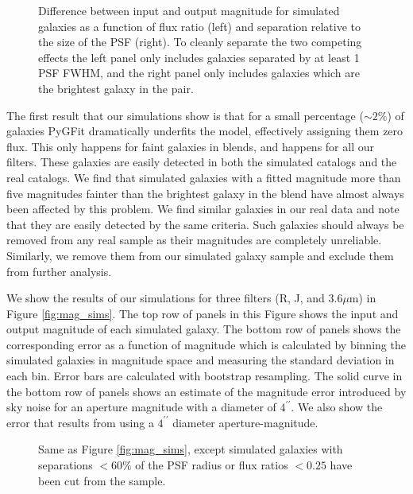 \documentclass[apj]{emulateapj}
\newcommand{\pygfit}{PyGFit}
\begin{document}
\begin{figure*}
\caption{Difference between input and output magnitude for simulated galaxies as a function of flux ratio (left) and separation relative to the size of the PSF (right).  To cleanly separate the two competing effects the left panel only includes galaxies separated by at least 1 PSF FWHM, and the right panel only includes galaxies which are the brightest galaxy in the pair.}\label{fig:close_sim}
\end{figure*}

The first result that our simulations show is that for a small percentage ($\sim2\%$) of galaxies \pygfit{} dramatically underfits the model, effectively assigning them zero flux.  This only happens for faint galaxies in blends, and happens for all our filters.  These galaxies are easily detected in both the simulated catalogs and the real catalogs.  We find that simulated galaxies with a fitted magnitude more than five magnitudes fainter than the brightest galaxy in the blend have almost always been affected by this problem.  We find similar galaxies in our real data and note that they are easily detected by the same criteria.  Such galaxies should always be removed from any real sample as their magnitudes are completely unreliable.  Similarly, we remove them from our simulated galaxy sample and exclude them from further analysis.

We show the results of our simulations for three filters (R, J, and $3.6\mu$m) in Figure \ref{fig:mag_sims}.  The top row of panels in this Figure shows the input and output magnitude of each simulated galaxy.  The bottom row of panels shows the corresponding error as a function of magnitude which is calculated by binning the simulated galaxies in magnitude space and measuring the standard deviation in each bin.  Error bars are calculated with bootstrap resampling.  The solid curve in the bottom row of panels shows an estimate of the magnitude error introduced by sky noise for an aperture magnitude with a diameter of $4^{\prime\prime}$.  We also show the error that results from using a $4^{\prime\prime}$ diameter aperture-magnitude.

\begin{figure*}
\caption{Same as Figure \ref{fig:mag_sims}, except simulated galaxies with separations $<60\%$ of the PSF radius or flux ratios $<0.25$ have been cut from the sample.}\label{fig:mag_sims_cut}
\end{figure*}
\end{document}
